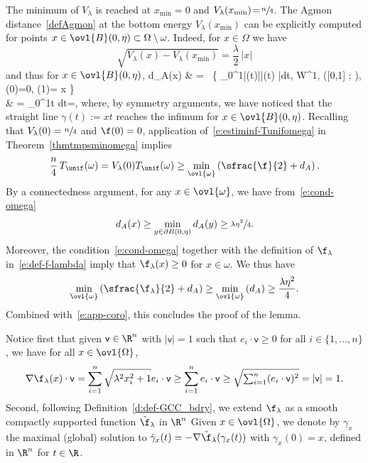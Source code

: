 The minimum of $V_\lambda$ is reached at $x_{\min}\!=\!0$ and $V_\lambda(x_{\min})\!=\!\sfrac{n}{4}$. The Agmon distance~\eqref{defAgmon} at the bottom energy $V_\lambda(x_{\min})$ can be explicitly computed for points $x \in \ovl{B}(0,\eta) \subset \Omega \setminus \omega$. Indeed, for $x \in \Omega$ we have
\[
\sqrt{V_\lambda(x) - V_\lambda(x_{\min})} = \frac{\lambda}{2}\,|x|
\]
and thus for $x \in \ovl{B}(0,\eta)$,
\bal
d_{A}(x) & = \, \inf \left\{ \int_0^1|\gamma(t)||\dot{\gamma}(t) |dt, \gamma \in W^{1,\infty} ([0,1] ; \M ), \gamma(0)=0, \gamma(1)= x \right\} \\
& =  \int_0^1t dt=,
\nal
where, by symmetry arguments, we have noticed that the straight line $\gamma(t):=xt$ reaches the infimum for $x \in \ovl{B}(0,\eta)$.
Recalling that
$V_\lambda(0) = \sfrac{n}{4}$ and $\f(0) =0$, application of~\eqref{e:estiminf-Tunifomega} in Theorem~\ref{thmtmpsminomega} implies
\begin{equation}
\label{e:app-coro}
\frac{n}{4}\,T_{\unif}(\omega)= V_\lambda(0)T_{\unif}(\omega) \geq \min_{\ovl{\omega}}\left( \sfrac{\f}{2} + d_{A} \right).
\end{equation}
By a connectedness argument, for any $x \in \ovl{\omega}$, we have from~\eqref{e:cond-omega}
\[
d_A(x) \geq \min_{y\in \partial B(0,\eta)} d_A(y)\geq \sfrac{\lambda \eta^2}{4}.
\]
Moreover, the condition~\eqref{e:cond-omega} together with the definition of $\f_\lambda$ in~\eqref{e:def-f-lambda} imply that $\f_\lambda(x)\geq 0$ for $x \in \omega$. We thus have
\[
\min_{\ovl{\omega}}\left( \sfrac{\f_\lambda}{2} + d_{A} \right) \geq \min_{\ovl{\omega}}\left( d_{A} \right) \geq \frac{\lambda \eta^2}{4}.
\]
Combined with~\eqref{e:app-coro}, this concludes the proof of the lemma.
\enp

Notice first that given $\mathsf{v}\in \R^n$ with $|\mathsf{v}|=1$ such that $e_i \cdot \mathsf{v} \geq 0$ for all $i \in \{1,\dots, n\}$, we have for all $x\in \ovl{\Omega}$,
\begin{equation}
\label{nablaflambda}
\nabla \f_\lambda(x) \cdot \mathsf{v} = \sum_{i=1}^n \sqrt{\lambda^2 x_i^2+1} e_i \cdot \mathsf{v} \geq \sum_{i=1}^n e_i \cdot \mathsf{v} \geq \sqrt{\textstyle\sum_{i=1}^n (e_i \cdot \mathsf{v})^2 }= |\mathsf{v}|= 1.
\end{equation}
Second, following Definition~\ref{d:def-GCC_bdry}, we extend $\f_{\lambda}$ as a smooth compactly supported function $\tilde{\f}_{\lambda}$ in $\R^n$
Given $x\in \ovl{\Omega}$, we denote by $\gamma_x$ the maximal (global) solution to $\dot{\gamma}_x(t) = -\nabla\tilde{\f}_{\lambda}(\gamma_x(t))$ with $\gamma_x(0)=x$, defined in $\R^n$ for $t\in \R$.

